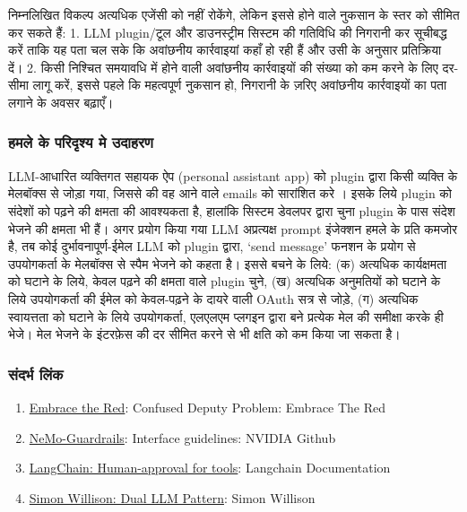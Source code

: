 \documentclass[
]{article}
\providecommand{\tightlist}{%
  \setlength{\itemsep}{0pt}\setlength{\parskip}{0pt}}
\begin{document}
निम्नलिखित विकल्प अत्यधिक एजेंसी को नहीं रोकेंगे, लेकिन इससे होने वाले नुकसान के स्तर को
सीमित कर सकते हैं: 1. LLM plugin/टूल और डाउनस्ट्रीम सिस्टम की गतिविधि की
निगरानी कर सूचीबद्ध करें ताकि यह पता चल सके कि अवांछनीय कार्रवाइयां कहाँ हो रही हैं
और उसी के अनुसार प्रतिक्रिया दें। 2. किसी निश्चित समयावधि में होने वाली अवांछनीय
कार्रवाइयों की संख्या को कम करने के लिए दर-सीमा लागू करें, इससे पहले कि महत्वपूर्ण
नुकसान हो, निगरानी के ज़रिए अवांछनीय कार्रवाइयों का पता लगाने के अवसर बढ़ाएँ।

\subsubsection{हमले के परिदृश्य मे
उदाहरण}\label{ux939ux92eux932-ux915-ux92aux930ux926ux936ux92f-ux92e-ux909ux926ux939ux930ux923}

LLM-आधारित व्यक्तिगत सहायक ऐप (personal assistant app) को plugin द्वारा
किसी व्यक्ति के मेलबॉक्स से जोड़ा गया, जिससे की वह आने वाले emails को सारांशित करे ।
इसके लिये plugin को संदेशों को पढ़ने की क्षमता की आवश्यकता है, हालांकि सिस्टम डेवलपर
द्वारा चुना plugin के पास संदेश भेजने की क्षमता भी हैं। अगर प्रयोग किया गया LLM
अप्रत्यक्ष prompt इंजेक्शन हमले के प्रति कमजोर है, तब कोई दुर्भावनापूर्ण-ईमेल LLM को
plugin द्वारा, `send message' फनशन के प्रयोग से उपयोगकर्ता के मेलबॉक्स से स्पैम भेजने
को कहता है। इससे बचने के लिये: (क) अत्यधिक कार्यक्षमता को घटाने के लिये, केवल पढ़ने की
क्षमता वाले plugin चुने, (ख) अत्यधिक अनुमतियों को घटाने के लिये उपयोगकर्ता की ईमेल
को केवल-पढ़ने के दायरे वाली OAuth सत्र से जोड़े, (ग) अत्यधिक स्वायत्तता को घटाने के
लिये उपयोगकर्ता, एलएलएम प्लगइन द्वारा बने प्रत्येक मेल की समीक्षा करके ही भेजे। मेल
भेजने के इंटरफ़ेस की दर सीमित करने से भी क्षति को कम किया जा सकता है।

\subsubsection{संदर्भ लिंक}\label{ux938ux926ux930ux92d-ux932ux915}

\begin{enumerate}
\def\labelenumi{\arabic{enumi}.}
\tightlist
\item
  \href{https://embracethered.com/blog/posts/2023/chatgpt-cross-plugin-request-forgery-and-prompt-injection./}{Embrace
  the Red}: Confused Deputy Problem: Embrace The Red
\item
  \href{https://github.com/NVIDIA/NeMo-Guardrails/blob/main/docs/security/guidelines.md}{NeMo-Guardrails}:
  Interface guidelines: NVIDIA Github
\item
  \href{https://python.langchain.com/docs/modules/agents/tools/human_approval}{LangChain:
  Human-approval for tools}: Langchain Documentation
\item
  \href{https://simonwillison.net/2023/Apr/25/dual-llm-pattern/}{Simon
  Willison: Dual LLM Pattern}: Simon Willison
\end{enumerate}
\end{document}
